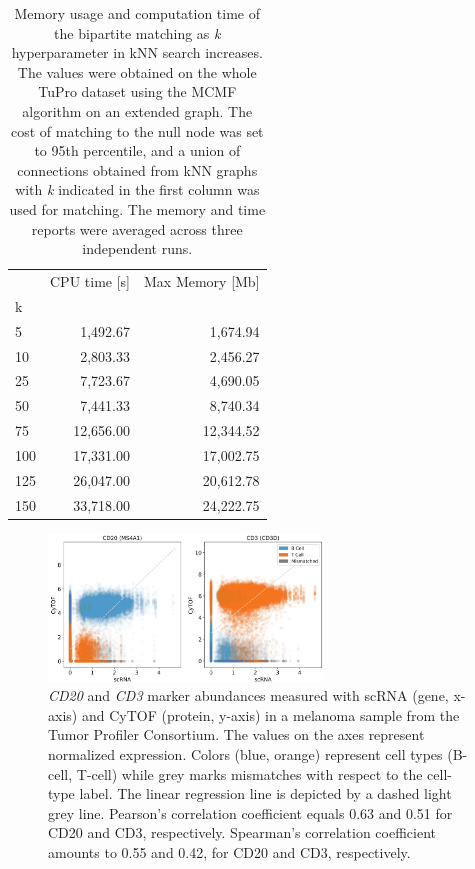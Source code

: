 \begin{table}[h]
\centering
\begin{tabular}{lrr}
\toprule
{} &  CPU time [s] &  Max Memory [Mb] \\
k   &               &                  \\
\midrule
5   &       1,492.67 &          1,674.94 \\
10  &       2,803.33 &          2,456.27 \\
25  &       7,723.67 &          4,690.05 \\
50  &       7,441.33 &          8,740.34 \\
75  &      12,656.00 &         12,344.52 \\
100 &      17,331.00 &         17,002.75 \\
125 &      26,047.00 &         20,612.78 \\
150 &      33,718.00 &         24,222.75 \\
\bottomrule
\end{tabular}
\caption{Memory usage and computation time of the bipartite matching as \textit{k} hyperparameter in kNN search increases.
The values were obtained on the whole TuPro dataset using the MCMF algorithm on an extended graph. %
The cost of matching to the null node was set to 95th percentile, and a union of connections obtained from kNN graphs with \textit{k} indicated in the first column was used for matching.
The memory and time reports were averaged across three independent runs.}
\label{tbl:menytek_tune_k_uni}
\end{table}

\begin{figure}[htbp]
    \centering
    \includegraphics[width=0.65\textwidth]{figures/integration/gene_protein_correlation_unicapacity}
    \caption{
      \textit{CD20} and \textit{CD3} marker abundances measured with scRNA (gene, x-axis) and CyTOF (protein, y-axis) in a melanoma sample from the Tumor Profiler Consortium.
      The values on the axes represent normalized expression.
      Colors (blue, orange) represent cell types (B-cell, T-cell) while grey marks mismatches with respect to the cell-type label.
      The linear regression line is depicted by a dashed light grey line.
      Pearson's correlation coefficient equals 0.63 and 0.51 for CD20 and CD3, respectively.
      Spearman's correlation coefficient amounts to 0.55 and 0.42, for CD20 and CD3, respectively.
    }
    \label{fig:tupro-marker-correlation-uni}
\end{figure}

